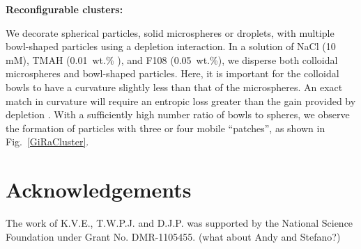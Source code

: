 \documentclass[aps,pre,preprint,superscriptaddress,nofootinbib]{revtex4-1}
\begin{document}
\textbf{Reconfigurable clusters:}

We decorate spherical particles, solid microspheres or droplets, with multiple bowl-shaped particles using a depletion interaction.
In a solution of NaCl (10 mM), TMAH (0.01~wt.\% ), and F108 (0.05~wt.\%), we disperse both colloidal microspheres and bowl-shaped particles.
Here, it is important for the colloidal bowls to have a curvature slightly less than that of the microspheres.
An exact match in curvature will require an entropic loss greater than the gain provided by depletion \cite{Sacanna2010Lock}.
With a sufficiently high number ratio of bowls to spheres, we observe the formation of particles with three or four mobile ``patches'', as shown in Fig.~\ref{GiRaCluster}.


\section{Acknowledgements}
The work of K.V.E., T.W.P.J. and D.J.P. was supported by the National Science Foundation under Grant No. DMR-1105455. (what about Andy and Stefano?)


\end{document}

